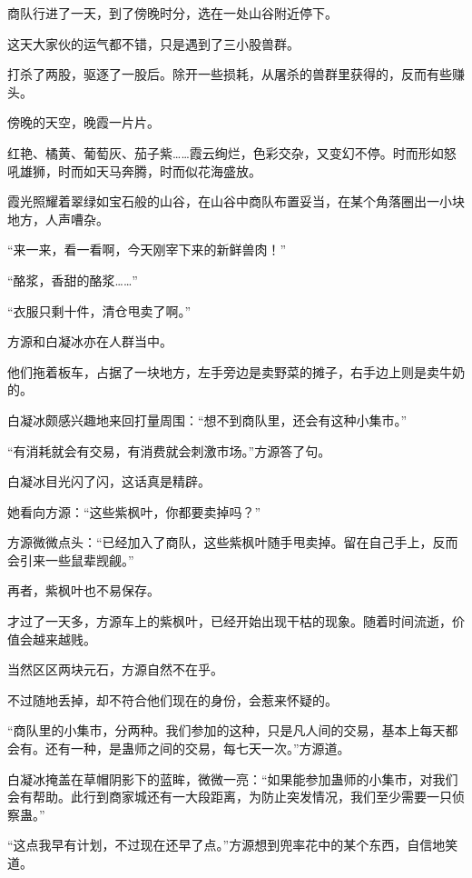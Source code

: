 
\begin{this_body}

商队行进了一天，到了傍晚时分，选在一处山谷附近停下。

这天大家伙的运气都不错，只是遇到了三小股兽群。

打杀了两股，驱逐了一股后。除开一些损耗，从屠杀的兽群里获得的，反而有些赚头。

傍晚的天空，晚霞一片片。

红艳、橘黄、葡萄灰、茄子紫……霞云绚烂，色彩交杂，又变幻不停。时而形如怒吼雄狮，时而如天马奔腾，时而似花海盛放。

霞光照耀着翠绿如宝石般的山谷，在山谷中商队布置妥当，在某个角落圈出一小块地方，人声嘈杂。

“来一来，看一看啊，今天刚宰下来的新鲜兽肉！”

“酪浆，香甜的酪浆……”

“衣服只剩十件，清仓甩卖了啊。”

方源和白凝冰亦在人群当中。

他们拖着板车，占据了一块地方，左手旁边是卖野菜的摊子，右手边上则是卖牛奶的。

白凝冰颇感兴趣地来回打量周围：“想不到商队里，还会有这种小集市。”

“有消耗就会有交易，有消费就会刺激市场。”方源答了句。

白凝冰目光闪了闪，这话真是精辟。

她看向方源：“这些紫枫叶，你都要卖掉吗？”

方源微微点头：“已经加入了商队，这些紫枫叶随手甩卖掉。留在自己手上，反而会引来一些鼠辈觊觎。”

再者，紫枫叶也不易保存。

才过了一天多，方源车上的紫枫叶，已经开始出现干枯的现象。随着时间流逝，价值会越来越贱。

当然区区两块元石，方源自然不在乎。

不过随地丢掉，却不符合他们现在的身份，会惹来怀疑的。

“商队里的小集市，分两种。我们参加的这种，只是凡人间的交易，基本上每天都会有。还有一种，是蛊师之间的交易，每七天一次。”方源道。

白凝冰掩盖在草帽阴影下的蓝眸，微微一亮：“如果能参加蛊师的小集市，对我们会有帮助。此行到商家城还有一大段距离，为防止突发情况，我们至少需要一只侦察蛊。”

“这点我早有计划，不过现在还早了点。”方源想到兜率花中的某个东西，自信地笑道。


\end{this_body}
